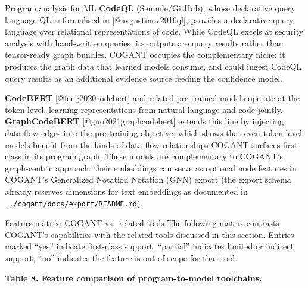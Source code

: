 \documentclass[
  ignorenonframetext,
]{beamer}
\begin{document}
\begin{frame}[fragile]{Program analysis for ML}
\textbf{CodeQL} (Semmle/GitHub), whose declarative query language QL is
formalised in {[}@avgustinov2016ql{]}, provides a declarative query
language over relational representations of code. While CodeQL excels at
security analysis with hand-written queries, its outputs are query
results rather than tensor-ready graph bundles. COGANT occupies the
complementary niche: it produces the graph data that learned models
consume, and could ingest CodeQL query results as an additional evidence
source feeding the confidence model.

\textbf{CodeBERT} {[}@feng2020codebert{]} and related pre-trained models
operate at the token level, learning representations from natural
language and code jointly. \textbf{GraphCodeBERT}
{[}@guo2021graphcodebert{]} extends this line by injecting data-flow
edges into the pre-training objective, which shows that even token-level
models benefit from the kinds of data-flow relationships COGANT surfaces
first-class in its program graph. These models are complementary to
COGANT's graph-centric approach: their embeddings can serve as optional
node features in COGANT's Generalized Notation Notation (GNN) export
(the export schema already reserves dimensions for text embeddings as
documented in \texttt{../cogant/docs/export/README.md}).

\begin{block}{Feature matrix: COGANT vs.~related tools}
\protect{}\label{feature-matrix-cogant-vs.-related-tools}
The following matrix contrasts COGANT's capabilities with the related
tools discussed in this section. Entries marked ``yes'' indicate
first-class support; ``partial'' indicates limited or indirect support;
``no'' indicates the feature is out of scope for that tool.

\textbf{Table 8. Feature comparison of program-to-model toolchains.}


\end{block}
\end{frame}
\end{document}
